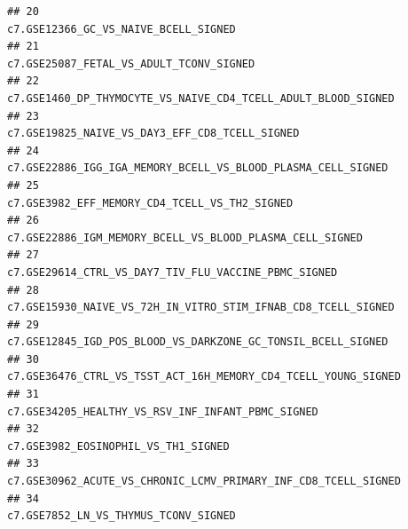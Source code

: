 \documentclass{article}\usepackage[]{graphicx}\usepackage[]{color}
\makeatletter
\newenvironment{kframe}{%
 \def\at@end@of@kframe{}%
 \ifinner\ifhmode%
  \def\at@end@of@kframe{\end{minipage}}%
  \begin{minipage}{\columnwidth}%
 \fi\fi%
 \def\FrameCommand##1{\hskip\@totalleftmargin \hskip-\fboxsep
 \colorbox{shadecolor}{##1}\hskip-\fboxsep
     \hskip-\linewidth \hskip-\@totalleftmargin \hskip\columnwidth}%
 \MakeFramed {\advance\hsize-\width
   \@totalleftmargin\z@ \linewidth\hsize
   \@setminipage}}%
 {\par\unskip\endMakeFramed%
 \at@end@of@kframe}
\newenvironment{knitrout}{}{} %
\makeatother
\begin{document}
\begin{knitrout}
\begin{kframe}
\begin{verbatim}
## 20                                                                                                                                               c7.GSE12366_GC_VS_NAIVE_BCELL_SIGNED
## 21                                                                                                                                            c7.GSE25087_FETAL_VS_ADULT_TCONV_SIGNED
## 22                                                                                                                      c7.GSE1460_DP_THYMOCYTE_VS_NAIVE_CD4_TCELL_ADULT_BLOOD_SIGNED
## 23                                                                                                                                     c7.GSE19825_NAIVE_VS_DAY3_EFF_CD8_TCELL_SIGNED
## 24                                                                                                                       c7.GSE22886_IGG_IGA_MEMORY_BCELL_VS_BLOOD_PLASMA_CELL_SIGNED
## 25                                                                                                                                      c7.GSE3982_EFF_MEMORY_CD4_TCELL_VS_TH2_SIGNED
## 26                                                                                                                           c7.GSE22886_IGM_MEMORY_BCELL_VS_BLOOD_PLASMA_CELL_SIGNED
## 27                                                                                                                               c7.GSE29614_CTRL_VS_DAY7_TIV_FLU_VACCINE_PBMC_SIGNED
## 28                                                                                                                      c7.GSE15930_NAIVE_VS_72H_IN_VITRO_STIM_IFNAB_CD8_TCELL_SIGNED
## 29                                                                                                                       c7.GSE12845_IGD_POS_BLOOD_VS_DARKZONE_GC_TONSIL_BCELL_SIGNED
## 30                                                                                                                     c7.GSE36476_CTRL_VS_TSST_ACT_16H_MEMORY_CD4_TCELL_YOUNG_SIGNED
## 31                                                                                                                                  c7.GSE34205_HEALTHY_VS_RSV_INF_INFANT_PBMC_SIGNED
## 32                                                                                                                                                c7.GSE3982_EOSINOPHIL_VS_TH1_SIGNED
## 33                                                                                                                     c7.GSE30962_ACUTE_VS_CHRONIC_LCMV_PRIMARY_INF_CD8_TCELL_SIGNED
## 34                                                                                                                                               c7.GSE7852_LN_VS_THYMUS_TCONV_SIGNED

\end{verbatim}
\end{kframe}
\end{knitrout}
\end{document}
